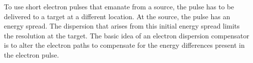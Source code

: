\documentclass[12pt,letterpaper]{article}
\begin{document}
To use short electron pulses that emanate from a source, the pulse has to be delivered to a target at a different location. At the source, the pulse has an energy spread. The dispersion that arises from this initial energy spread limits the resolution at the target. The basic idea of an electron dispersion compensator is to alter the electron paths to compensate for the energy differences present in the electron pulse.
\end{document}
